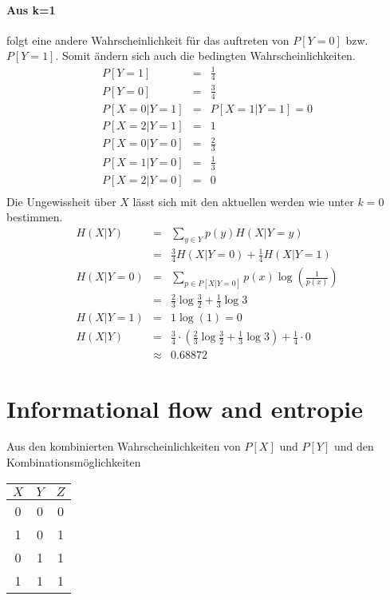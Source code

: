 \paragraph{Aus k=1} folgt eine andere Wahrscheinlichkeit für das auftreten von
$P[Y=0]$ bzw. $P[Y=1]$. Somit ändern sich auch die bedingten
Wahrscheinlichkeiten.
\begin{eqnarray}
    P[Y=1] &=& \frac{1}{4} \\
    P[Y=0] &=& \frac{3}{4} \\
    P[X=0|Y=1] &=& P[X=1|Y=1] = 0 \\
    P[X=2|Y=1] &=& 1 \\
    P[X=0|Y=0] &=& \frac{2}{3} \\
    P[X=1|Y=0] &=& \frac{1}{3} \\
    P[X=2|Y=0] &=& 0 \\
\end{eqnarray}
Die Ungewissheit über $X$ lässt sich mit den aktuellen werden wie unter $k=0$
bestimmen.
\begin{eqnarray}
    H(X|Y) &=& \sum_{y \in Y} p(y) H(X|Y=y) \nonumber \\
           &=& \frac{3}{4} H(X|Y=0) + \frac{1}{4} H(X|Y=1) \\
    H(X|Y=0) &=& \sum_{p \in P[X|Y=0]}p(x)\log \left( \frac{1}{p(x)} \right) \nonumber \\
           &=& \frac{2}{3}\log\frac{3}{2} + \frac{1}{3} \log{3} \\
    H(X|Y=1) &=&  1 \log(1) = 0 \\
    \label{eq:foo}
    H(X|Y) &=& \frac{3}{4}\cdot
                  \left(\frac{2}{3}\log\frac{3}{2} + \frac{1}{3} \log{3} \right)
               + \frac{1}{4} \cdot 0 \nonumber \\
           &\approx& 0.68872
\end{eqnarray}

\section{Informational flow and entropie}
Aus den kombinierten Wahrscheinlichkeiten von $P[X]$ und $P[Y]$ und den
Kombinationsmöglichkeiten \\
\begin{center}
\begin{tabular}{|cc|c|}
       \hline
       $X$ & $Y$ & $Z$ \\ \hline
        0  &  0  &  0  \\ \hline
        1  &  0  &  1  \\ \hline
        0  &  1  &  1  \\ \hline
        1  &  1  &  1  \\ \hline
\end{tabular}
\end{center}

